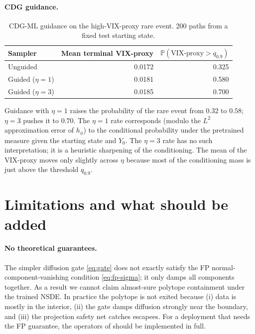 \documentclass[11pt]{article}
\newcommand{\Prob}{\mathbb{P}}
\newcommand{\1}{\mathbf{1}}
\begin{document}
\paragraph{CDG guidance.}

\begin{table}[h]
\centering
\begin{tabular}{lrr}
\toprule
Sampler & Mean terminal VIX-proxy & $\Prob(\text{VIX-proxy} > q_{0.9})$ \\
\midrule
Unguided                 & 0.0172 & 0.325 \\
Guided ($\eta = 1$)      & 0.0181 & 0.580 \\
Guided ($\eta = 3$)      & 0.0185 & 0.700 \\
\bottomrule
\end{tabular}
\caption{CDG-ML guidance on the high-VIX-proxy rare event. 200 paths from a fixed test starting state.}
\label{tab:cdg}
\end{table}

Guidance with $\eta = 1$ raises the probability of the rare event from $0.32$ to $0.58$; $\eta = 3$ pushes it to $0.70$. The $\eta = 1$ rate corresponds (modulo the $L^2$ approximation error of $h_\phi$) to the conditional probability under the pretrained measure given the starting state and $Y_0$. The $\eta = 3$ rate has no such interpretation; it is a heuristic sharpening of the conditioning. The mean of the VIX-proxy moves only slightly across $\eta$ because most of the conditioning mass is just above the threshold $q_{0.9}$.

\section{Limitations and what should be added}

\paragraph{No theoretical guarantees.} The simpler diffusion gate \eqref{eq:gate} does not exactly satisfy the FP normal-component-vanishing condition \eqref{eq:fp-sigma}; it only damps all components together. As a result we cannot claim almost-sure polytope containment under the trained NSDE. In practice the polytope is not exited because (i) data is mostly in the interior, (ii) the gate damps diffusion strongly near the boundary, and (iii) the projection safety net catches escapees. For a deployment that needs the FP guarantee, the operators of \citet[Section 3]{cohen2021} should be implemented in full.
\end{document}
